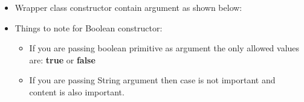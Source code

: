 \setlength{\columnsep}{3pt}
\begin{flushleft}
	
	\begin{itemize}
		\item Wrapper class constructor contain argument as shown below:
		\bigskip
		
		\bigskip
	
		\item Things to note for Boolean constructor:
		\begin{itemize}
			\item If you are passing boolean primitive as argument the only allowed values are: \textbf{true} or \textbf{false}
			\item If you are passing String argument then case is not important and content is also important.
		\end{itemize}
	

\end{itemize}
\end{flushleft}
